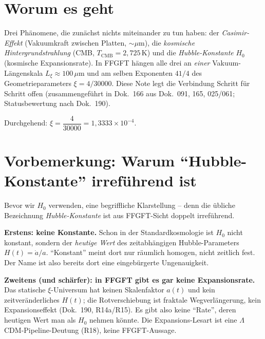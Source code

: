 

\section*{Worum es geht}

Drei Phänomene, die zunächst nichts miteinander zu tun haben:
der \emph{Casimir-Effekt} (Vakuumkraft zwischen Platten, $\sim\mu$m),
die \emph{kosmische Hintergrundstrahlung} (CMB, $T_\text{CMB}=2{,}725$\,K)
und die \emph{Hubble-Konstante} $H_0$ (kosmische Expansionsrate). In FFGFT
hängen alle drei an \emph{einer} Vakuum-Längenskala $L_\xi\approx100\,\mu$m und
am selben Exponenten $41/4$ des Geometrieparameters $\xi=4/30000$. Diese Note
legt die Verbindung Schritt für Schritt offen (zusammengeführt in Dok.~166 aus
Dok.~091, 165, 025/061; Statusbewertung nach Dok.~190).

\medskip
Durchgehend: $\xi = \dfrac{4}{30000} = 1{,}3333\times10^{-4}$.

\section{Vorbemerkung: Warum \enquote{Hubble-Konstante} irreführend ist}

Bevor wir $H_0$ verwenden, eine begriffliche Klarstellung -- denn die übliche
Bezeichnung \emph{Hubble-Konstante} ist aus FFGFT-Sicht doppelt irreführend.

\textbf{Erstens: keine Konstante.} Schon in der Standardkosmologie ist $H_0$
nicht konstant, sondern der \emph{heutige Wert} des zeitabhängigen
Hubble-Parameters $H(t)=\dot a/a$. \enquote{Konstant} meint dort nur räumlich
homogen, nicht zeitlich fest. Der Name ist also bereits dort eine eingebürgerte
Ungenauigkeit.

\textbf{Zweitens (und schärfer): in FFGFT gibt es gar keine Expansionsrate.}
Das statische $\xi$-Universum hat keinen Skalenfaktor $a(t)$ und kein
zeitveränderliches $H(t)$; die Rotverschiebung ist fraktale Wegverlängerung,
kein Expansionseffekt (Dok.~190, R14a/R15). Es gibt also keine \enquote{Rate},
deren heutigen Wert man als $H_0$ nehmen könnte. Die Expansions-Lesart ist eine
$\Lambda$CDM-Pipeline-Deutung (R18), keine FFGFT-Aussage.

